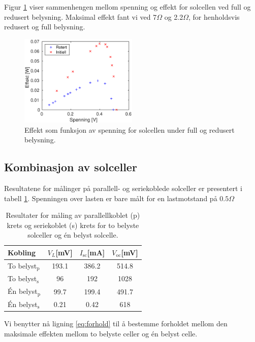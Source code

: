 \documentclass[a4paper,11pt, twocolumn]{article}
\begin{document}
Figur \ref{fig:effekt} viser sammenhengen mellom spenning og effekt for solcellen ved full og redusert belysning. Maksimal effekt fant vi ved 7$\Omega$ og 2.2$\Omega$, for henholdsvis redusert og full belysning.
\begin{figure}[!ht]
	\includegraphics[width = 0.5\textwidth]{matlab/LAB/optimalBelastning.eps}
	\caption{Effekt som funksjon av spenning for solcellen under full og redusert belysning.}
	\label{fig:effekt}
\end{figure}

\subsection{Kombinasjon av solceller}
Resultatene for målinger på parallell- og seriekoblede solceller er presentert i tabell \ref{tab:serieParallell}. Spenningen over lasten er bare målt for en lastmotstand på $0.5\Omega$

\begin{table}[!ht]
	\caption{Resultater for måling av parallellkoblet (p) krets og seriekoblet (s) krets for to belyste solceller og \'en belyst solcelle.}
	\label{tab:serieParallell}
	\begin{tabular}{lccc}
		\toprule
		\toprule
		Kobling & $V_L$[mV]  & $I_\text{sc}$[mA] & $V_\text{oc}$[mV]\\
		\hline
		To belyst$_\text{p}$ & 193.1  & 386.2 & 514.8\\
		To belyst$_\text{s}$ &  96  & 192 & 1028\\
		\'En belyst$_\text{p}$ &  99.7  & 199.4 & 491.7\\
		\'En belyst$_\text{s}$ &  0.21  & 0.42 & 618\\
		\toprule
	\end{tabular}
\end{table}

Vi benytter nå ligning \eqref{eq:forhold} til å bestemme forholdet mellom den maksimale effekten mellom to belyste celler og \'en belyst celle. 
\end{document}
